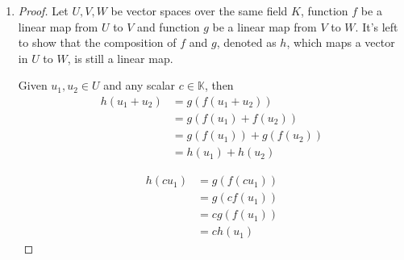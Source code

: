 \documentclass[paper=a4, fontsize=11pt]{scrartcl} %
\numberwithin{equation}{section} %
\numberwithin{figure}{section} %
\numberwithin{table}{section} %
\begin{document}
\begin{enumerate}
\begin{proof}
			Thus $c_1 v_1 + c_2 v_2 + ... + c_n v_n \in Ker(f)$. As $\{u_1, u_2, ... , u_m \}$ forms the basis of Ker($f$), there exists coefficients $d_i$ such that
			\begin{equation}
				c_1 v_1 + c_2 v_2 + ... + c_n v_n = d_1 u_1 + d_2 u_2 + ... + d_m u_m \label{diff}
			\end{equation}
			
			Since $\{u_1, u_2, ... , u_m, v_1, v_2, ... , v_n \}$ forms the basis of $V_1$, all the coefficients in (\ref{diff}) should be 0. Thus, (\ref{cdis}) is valid if and only if all the coefficents $c_i$ is 0, which implies that $\{f(v_1), f(v_2), ... , f(v_n)\}$ are linearly independent.
			
			Thus, $\{f(v_1), f(v_2), ... , f(v_n)\}$ forms the basis of $V_2$, and the dimension of $V_2$ is therefore $n$. The rank-nullity theorem written as below is proved.
			\begin{equation}
				dim(V_1) = dim(ker(f)) + dim(V_2)
			\end{equation}
		\end{proof}
	
	\item
		\begin{proof}
			Let $U, V, W$ be vector spaces over the same field $K$, function $f$ be a linear map from $U$ to $V$ and function $g$ be a linear map from $V$ to $W$. It's left to show that the composition of $f$ and $g$, denoted as $h$, which maps a vector in $U$ to $W$, is still a linear map.
			
			Given $u_1, u_2 \in U$ and any scalar $c \in \mathbb{K}$, then
			\begin{equation}
				\begin{aligned}
					h(u_1 + u_2) & = g(f(u_1 + u_2)) \\
								 & = g(f(u_1) + f(u_2)) \\
								 & = g(f(u_1)) + g(f(u_2)) \\
								 & = h(u_1) + h(u_2)
				\end{aligned}
			\end{equation}
			
			\begin{equation}
				\begin{aligned}
					h(c u_1) & = g(f(c u_1)) \\
							 & = g(c f(u_1)) \\
						     & = c g(f(u_1)) \\
							 & = c h(u_1)
				\end{aligned}
			\end{equation}
			

\end{proof}
\end{enumerate}
\end{document}
